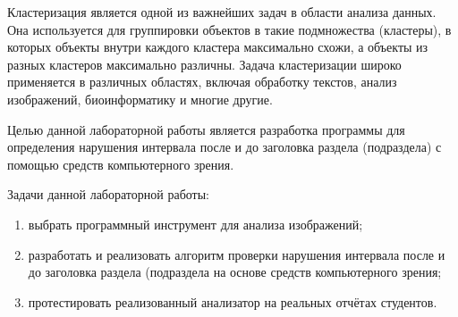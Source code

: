 
Кластеризация является одной из важнейших задач в области анализа данных. Она используется для группировки объектов в такие подмножества (кластеры), в которых объекты внутри каждого кластера максимально схожи, а объекты из разных кластеров максимально различны. Задача кластеризации широко применяется в различных областях, включая обработку текстов, анализ изображений, биоинформатику и многие другие.

Целью данной лабораторной работы является разработка программы для определения нарушения интервала после и до заголовка раздела (подраздела) с помощью средств компьютерного зрения.

Задачи данной лабораторной работы:
\begin{enumerate}[label*=\arabic*)]
	\item выбрать программный инструмент для анализа изображений;
	\item разработать и реализовать алгоритм проверки нарушения интервала после и до заголовка раздела (подраздела на основе средств компьютерного зрения;
	\item протестировать реализованный анализатор на реальных отчётах студентов.
\end{enumerate}

\clearpage

